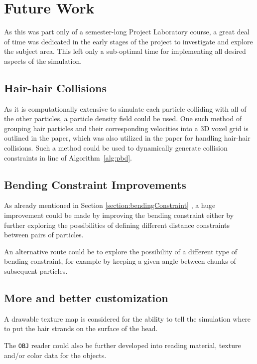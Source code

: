 \documentclass[sigplan,screen,nonacm]{acmart}
\begin{document}
\section{Future Work}
\label{sec:future_work}
As this was part only of a semester-long Project Laboratory course, a great deal
of time was dedicated in the early stages of the project to investigate and
explore the subject area. This left only a sub-optimal time for implementing all
desired aspects of the simulation.

\subsection{Hair-hair Collisions}
\label{subsec:future_work_collision}
As it is computationally extensive to simulate each particle colliding with all
of the other particles, a particle density field could be used. One such method
of grouping hair particles and their corresponding velocities into a 3D voxel
grid is outlined in the \citet{PixarVolumetricHair} paper, which was also
utilized in the \citet{FTLHair} paper for handling hair-hair collisions.
Such a method could be used to dynamically generate collision constraints in
line  of Algorithm~\ref{alg:pbd}.

\subsection{Bending Constraint Improvements}
As already mentioned in Section \ref{section:bendingConstraint}
, a huge improvement could be made by
improving the bending constraint either by further exploring the possibilities
of defining different distance constraints between pairs of particles.

An alternative route could be to explore the possibility of a different type of
bending constraint, for example by keeping a given angle between chunks of
subsequent particles.

\subsection{More and better customization} 
\label{section:futureCustomization}
A drawable texture map is considered for the ability to tell the simulation
where to put the hair strands on the surface of the head.

The \texttt{OBJ} reader could also be further developed into reading material,
texture and/or color data for the objects.
\end{document}
